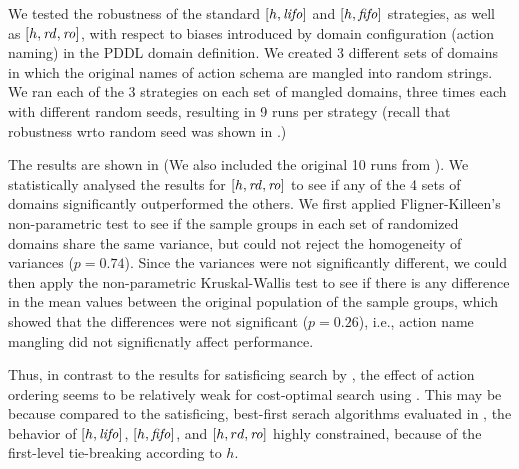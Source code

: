 
We tested the robustness of the standard $[h,\mbox{\textit{lifo}}]$ and $[h,\mbox{\textit{fifo}}]$ strategies, as well as $[h,\mbox{\textit{rd}},\mbox{\textit{ro}}]$,
with respect to 
biases introduced by domain configuration (action naming) in the PDDL domain definition.
We created 3 different sets of domains in which the
original names of action schema are mangled into random strings. 
We ran each of the 3 strategies on each
set of mangled domains, three times each with different random seeds,
resulting in 9 runs per strategy (recall that robustness wrto random seed was shown in .)

The results are shown in  (We
also included the original 10 runs from  ).
We statistically analysed the results for $[h,\mbox{\textit{rd}},\mbox{\textit{ro}}]$ 
to see if any of the 4 sets of domains
significantly outperformed the others.
We first applied Fligner-Killeen's non-parametric test to see if the sample groups 
in each set of randomized domains share the same variance, 
but could not reject the homogeneity of variances ($p=0.74$).
Since the variances were not significantly different,
we could then apply the non-parametric Kruskal-Wallis test to see if
there is any difference in the mean values between the original
population of the sample groups, which showed that the differences were not significant ($p=0.26$),
i.e., action name mangling did not significnatly affect performance.

Thus, in contrast to the results for satisficing search by \cite{vallati2015effective}, 
the effect of action ordering  seems to be relatively weak for cost-optimal search using \astar.
This may be because 
compared to the satisficing, best-first serach algorithms evaluated in \cite{vallati2015effective},
the behavior of $[h,\mbox{\textit{lifo}}]$, $[h,\mbox{\textit{fifo}}]$, and $[h,rd,\mbox{\textit{ro}}]$ highly
constrained, because of the first-level tie-breaking according to $h$.

